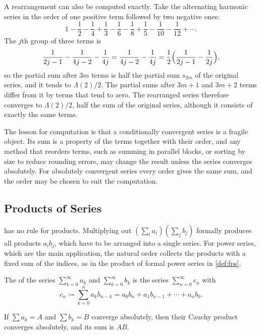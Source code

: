 A rearrangement can also be computed exactly. Take the alternating harmonic series in the order of one positive term followed by two negative ones:
\[
1-\frac12-\frac14+\frac13-\frac16-\frac18+\frac15-\frac1{10}-\frac1{12}+\cdots .
\]
The $j$th group of three terms is
\[
\frac1{2j-1}-\frac1{4j-2}-\frac1{4j}=\frac1{4j-2}-\frac1{4j}=\frac12\Bigl(\frac1{2j-1}-\frac1{2j}\Bigr),
\]
so the partial sum after $3m$ terms is half the partial sum $s_{2m}$ of the original series, and it tends to $\Lambda(2)/2$. The partial sums after $3m+1$ and $3m+2$ terms differ from it by terms that tend to zero. The rearranged series therefore converges to $\Lambda(2)/2$, half the sum of the original series, although it consists of exactly the same terms.

The lesson for computation is that a conditionally convergent series is a fragile object. Its sum is a property of the terms together with their order, and any method that reorders terms, such as summing in parallel blocks, or sorting by size to reduce rounding errors, may change the result unless the series converges absolutely. For absolutely convergent series every order gives the same sum, and the order may be chosen to suit the computation.

\subsection{Products of Series}

 has no rule for products. Multiplying out $(\sum_ia_i)(\sum_jb_j)$ formally produces all products $a_ib_j$, which have to be arranged into a single series. For power series, which are the main application, the natural order collects the products with a fixed sum of the indices, as in the product of formal power series in \cref{def:fps}.

\begin{definition}
\label{def:cauchy-product}
The  of the series $\sum_{k=0}^\infty a_k$ and $\sum_{k=0}^\infty b_k$ is the series $\sum_{n=0}^\infty c_n$ with
\[
c_n\coloneqq\sum_{k=0}^na_kb_{n-k}=a_0b_n+a_1b_{n-1}+\cdots+a_nb_0 .
\]
\end{definition}

\begin{theorem}
\label{thm:cauchy-product}
If $\sum a_k=A$ and $\sum b_k=B$ converge absolutely, then their Cauchy product converges absolutely, and its sum is $AB$.
\end{theorem}

